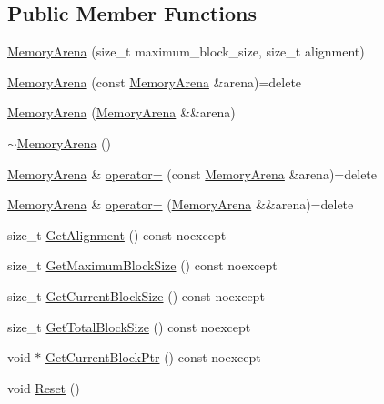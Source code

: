 \subsection*{Public Member Functions}
\begin{DoxyCompactItemize}
\item 
\mbox{\hyperlink{classmage_1_1_memory_arena_a139f7781be209bb29e7ad0ed04cb32a5}{Memory\+Arena}} (size\+\_\+t maximum\+\_\+block\+\_\+size, size\+\_\+t alignment)
\item 
\mbox{\hyperlink{classmage_1_1_memory_arena_a1eca6fdacbd1226f4b21f443d118168b}{Memory\+Arena}} (const \mbox{\hyperlink{classmage_1_1_memory_arena}{Memory\+Arena}} \&arena)=delete
\item 
\mbox{\hyperlink{classmage_1_1_memory_arena_a98829c5a87ba028c376f100cca09e876}{Memory\+Arena}} (\mbox{\hyperlink{classmage_1_1_memory_arena}{Memory\+Arena}} \&\&arena)
\item 
\mbox{\hyperlink{classmage_1_1_memory_arena_acfee6fc205e2eaf6aeef4acf19948e6e}{$\sim$\+Memory\+Arena}} ()
\item 
\mbox{\hyperlink{classmage_1_1_memory_arena}{Memory\+Arena}} \& \mbox{\hyperlink{classmage_1_1_memory_arena_a7e7799f859c55435714933972ecb8b95}{operator=}} (const \mbox{\hyperlink{classmage_1_1_memory_arena}{Memory\+Arena}} \&arena)=delete
\item 
\mbox{\hyperlink{classmage_1_1_memory_arena}{Memory\+Arena}} \& \mbox{\hyperlink{classmage_1_1_memory_arena_aa4b80a917a838a1ca3788f906723d273}{operator=}} (\mbox{\hyperlink{classmage_1_1_memory_arena}{Memory\+Arena}} \&\&arena)=delete
\item 
size\+\_\+t \mbox{\hyperlink{classmage_1_1_memory_arena_a79931a18af492ad8ef7e99b09ec36f2a}{Get\+Alignment}} () const noexcept
\item 
size\+\_\+t \mbox{\hyperlink{classmage_1_1_memory_arena_a6786cf52a03777580b439cafdd8ff8f9}{Get\+Maximum\+Block\+Size}} () const noexcept
\item 
size\+\_\+t \mbox{\hyperlink{classmage_1_1_memory_arena_a0b41d6901c3519f046cd551931f72c1b}{Get\+Current\+Block\+Size}} () const noexcept
\item 
size\+\_\+t \mbox{\hyperlink{classmage_1_1_memory_arena_ac8e8ac4ba60cd2bb1d8dc8a5d4a9f4ad}{Get\+Total\+Block\+Size}} () const noexcept
\item 
void $\ast$ \mbox{\hyperlink{classmage_1_1_memory_arena_a7bdbc9da32c1f8d49ce5d2f153870284}{Get\+Current\+Block\+Ptr}} () const noexcept
\item 
void \mbox{\hyperlink{classmage_1_1_memory_arena_a117b74c7bd5dfb28dfdaae6cab253491}{Reset}} ()

\end{DoxyCompactItemize}
